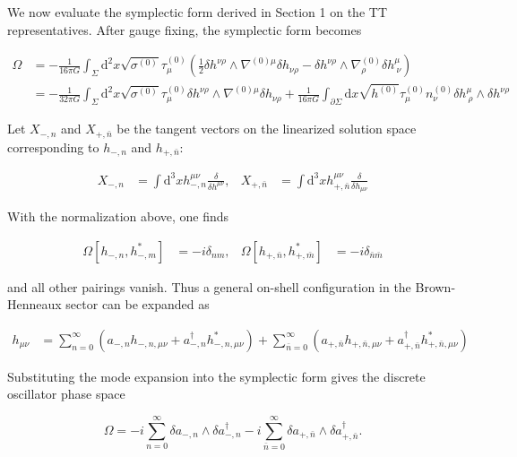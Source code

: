 We now evaluate the symplectic form derived in Section 1 on the TT representatives. After gauge fixing, the symplectic form becomes

\begin{align}
\Omega & =-\frac{1}{16\pi G}\int _{\Sigma}\mathrm{d}^{2}x\sqrt{ \sigma ^{(0)} }\tau ^{(0)} _{\mu}\left(\frac{1}{2}\delta h^{\nu \rho}\wedge \nabla ^{(0)\mu}\delta h_{\nu \rho}-\delta h^{\nu \rho}\wedge\nabla ^{(0)}_{\rho}\delta h^{\mu}_{~\nu}\right) \\
 & =-\frac{1}{32\pi G}\int _{\Sigma}\mathrm{d}^{2}x\sqrt{ \sigma ^{(0)} }\tau ^{(0)} _{\mu}\delta h^{\nu \rho}\wedge \nabla ^{(0)\mu}\delta h_{\nu \rho}+\frac{1}{16\pi G}\int _{\partial \Sigma}\mathrm{d}x\sqrt{ h^{(0)} }\tau ^{(0)} _{\mu}n^{(0)}_{\nu}\delta h^{\mu}_{~\rho}\wedge \delta h^{\nu \rho}
\end{align}

Let \(X_{-,n}\) and \(X_{+,\bar n}\) be the tangent vectors on the linearized solution space corresponding to \(h_{-,n}\) and \(h_{+,\bar n}\):

\begin{align}
X_{-,n} & =\int \mathrm{d}^{3}xh^{\mu \nu}_{-,n} \frac{\delta}{\delta h^{\mu \nu}}, & X_{+,\bar{n}} & =\int \mathrm{d}^{3}xh^{\mu \nu}_{+,\bar{n}} \frac{\delta}{\delta h_{\mu \nu}}
\end{align}

With the normalization above, one finds

\begin{align}
\Omega[h_{-,n},h^{*}_{-,m}] & =-i\delta _{nm}, & \Omega[h_{+,\bar{n}},h^{*}_{+,\bar{m}}] & =-i\delta _{\bar{n}\bar{m}}
\end{align}

and all other pairings vanish. Thus a general on-shell configuration in the Brown-Henneaux sector can be expanded as

\begin{align}
h_{\mu \nu} & =\sum ^{\infty}_{n=0}\left(a_{-,n}h_{-,n,\mu \nu}+a^{\dagger}_{-,n}h^{*}_{-,n,\mu \nu}\right)+\sum ^{\infty}_{\bar{n}=0}(a_{+,\bar{n}}h_{+,\bar{n},\mu \nu}+a^{\dagger}_{+,\bar{n}}h^{*}_{+,\bar{n},\mu \nu})
\end{align}

Substituting the mode expansion into the symplectic form gives the discrete oscillator phase space

\[
\Omega=-i\sum_{n=0}^{\infty}\delta a_{-,n}\wedge\delta a^{\dagger}_{-,n}-i\sum_{\bar n=0}^{\infty}\delta a_{+,\bar n}\wedge\delta a^{\dagger}_{+,\bar n}.
\]

